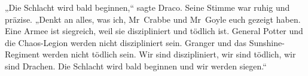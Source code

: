 „Die Schlacht wird bald beginnen,“ sagte Draco. Seine Stimme war ruhig und präzise. „Denkt an alles, was ich, Mr~Crabbe und Mr~Goyle euch gezeigt haben. Eine Armee ist siegreich, weil sie diszipliniert und tödlich ist. General Potter und die Chaos-Legion werden nicht diszipliniert sein. Granger und das Sunshine-Regiment werden nicht tödlich sein. Wir sind diszipliniert, wir sind tödlich, wir sind Drachen. Die Schlacht wird bald beginnen und wir werden siegen.“


